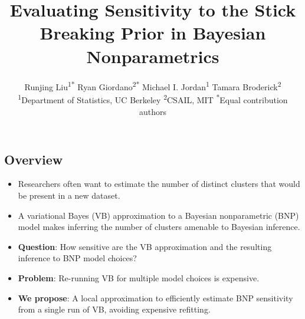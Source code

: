 \documentclass[a0,plainsections,30pt]{sciposter}\usepackage[]{graphicx}\usepackage[]{color}
\title{\textcolor{mydarkblue}{
Evaluating Sensitivity to the Stick Breaking Prior in Bayesian Nonparametrics
}}
\author{%
Runjing Liu\textsuperscript{1*} \quad
Ryan Giordano\textsuperscript{2*} \quad
Michael I. Jordan\textsuperscript{1} \quad
Tamara Broderick\textsuperscript{2} \\
{\large\normalfont
 \textsuperscript{1}Department of Statistics, UC Berkeley\quad
 \textsuperscript{2}CSAIL, MIT\quad
 \textsuperscript{*}Equal contribution authors}
}
\begin{document}

\setlength{\parskip}{0.25em}

\maketitle

\vspace{-1in}





\begin{minipage}[t]{0.45\textwidth}

\begin{mdframed}[style=MyFrame]
\section*{Overview}
\vspace{-0.3in}
\begin{itemize}
\item Researchers often want to estimate the number of distinct clusters
that would be present in a new dataset.

\item A variational Bayes (VB) approximation to a Bayesian nonparametric (BNP)
model makes inferring the number of clusters amenable to Bayesian inference.

\item \textbf{Question}: How sensitive are the
VB approximation and the resulting inference to BNP model choices?

\item \textbf{Problem}: Re-running VB for multiple model choices is expensive.

\item \textbf{We propose}: A local approximation to efficiently
estimate BNP sensitivity from a single run of VB, avoiding
expensive refitting.

\end{itemize}
\end{mdframed}
\vspace{-0.7in}


\end{minipage}
\end{document}
